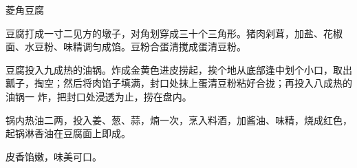 \begin{recipe}{菱角豆腐}

\ingredients


\preparation

\step 豆腐打成一寸二见方的墩子，对角划穿成三十个三角形。猪肉剁茸，加盐、花椒
面、水豆粉、味精调匀成馅。豆粉合蛋清搅成蛋清豆粉。

\step 豆腐投入九成热的油锅。炸成金黄色进皮捞起，挨个地从底部逢中划个小口，取出
瓤子，掏空；然后将肉馅子填满，封口处抹上蛋清豆粉粘好合拢；再投入八成热的油锅一
炸，把封口处浸透为止，捞在盘内。

\step 锅内热油二两，投入姜、葱、蒜，煵一次，烹入料酒，加酱油、味精，烧成红色，
起锅淋香油在豆腐面上即成。

\features

皮香馅嫩，味美可口。

\end{recipe}

